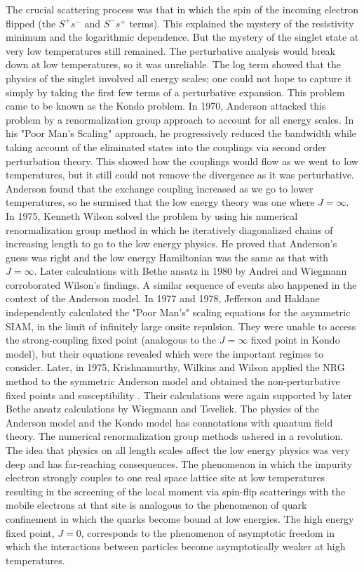 \documentclass[12pt,twoside]{report}
\numberwithin{equation}{section}
\begin{document}
The crucial scattering process was that in which the spin of the incoming electron flipped (the \(S^+ s^-\) and \(S^- s^+\) terms).
This explained the mystery of the resistivity minimum and the logarithmic dependence.
But the mystery of the singlet state at very low temperatures still remained.
The perturbative analysis would break down at low temperatures, so it was unreliable.
The log term showed that the physics of the singlet involved all energy scales; one could not hope to capture it simply by taking the first few terms of a perturbative expansion.
This problem came to be known as the Kondo problem.
\pb In 1970, Anderson attacked this problem by a renormalization group approach to account for all energy scales.
In his "Poor Man's Scaling" approach, he progressively reduced the bandwidth while taking account of the eliminated states into the couplings via second order perturbation theory.
This showed how the couplings would flow as we went to low temperatures, but it still could not remove the divergence as it was perturbative.
Anderson found that the exchange coupling increased as we go to lower temperatures, so he surmised that the low energy theory was one where \(J=\infty\).
In 1975, Kenneth Wilson solved the problem by using his numerical renormalization group method in which he iteratively diagonalized chains of increasing length to go to the low energy physics.
He proved that Anderson's guess was right and the low energy Hamiltonian was the same as that with \(J=\infty\).
Later calculations with Bethe ansatz in 1980 by Andrei and Wiegmann \cite{andrei_kondo,wiegmann} corroborated Wilson's findings.
\pb A similar sequence of events also happened in the context of the Anderson model. In 1977 and 1978, Jefferson and Haldane independently calculated the "Poor Man's" scaling equations for the asymmetric SIAM, in the limit of infinitely large onsite repulsion. They were unable to access the strong-coupling fixed point (analogous to the \(J=\infty\) fixed point in Kondo model), but their equations revealed which were the important regimes to consider. Later, in 1975, Krishnamurthy, Wilkins and Wilson applied the NRG method to the symmetric Anderson model and obtained the non-perturbative fixed points and susceptibility \cite{hrk-nrg}. Their calculations were again supported by later Bethe ansatz calculations by Wiegmann and Tsvelick\cite{Tsvelick}.
\pb The physics of the Anderson model and the Kondo model has connotations with quantum field theory. The numerical renormalization group methods ushered in a revolution. The idea that physics on all length scales affect the low energy physics was very deep and has far-reaching consequences. The phenomenon in which the impurity electron strongly couples to one real space lattice site at low temperatures resulting in the screening of the local moment via spin-flip scatterings with the mobile electrons at that site is analogous to the phenomenon of quark confinement in which the quarks become bound at low energies. The high energy fixed point, \(J=0\), corresponds to the phenomenon of asymptotic freedom in which the interactions between particles become asymptotically weaker at high temperatures.
\end{document}
